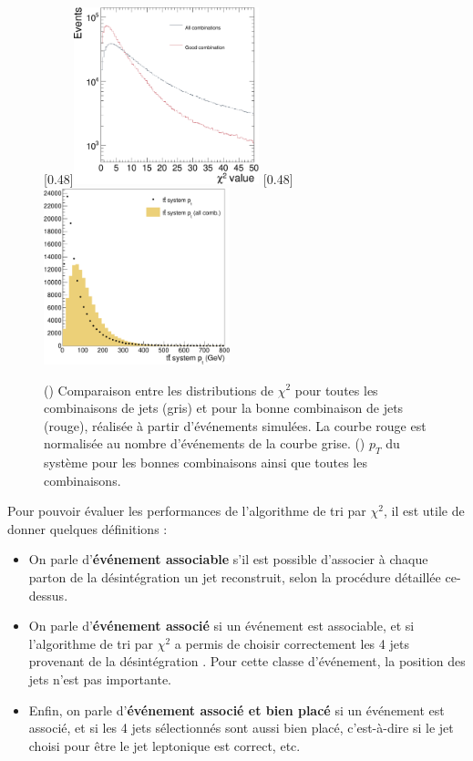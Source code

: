 \begin{figure}[tbp] \centering
    \subcaptionbox{\label{fig:chi2_distribution}}[0.48\textwidth]{\includegraphics[width=0.48\textwidth]{chapitre6/figs/chi2/chi2_distribution.pdf}} \hfill
    \subcaptionbox{\label{fig:chi2_ptsyst}}[0.48\textwidth]{\includegraphics[width=0.48\textwidth]{chapitre6/figs/chi2/chi2_discrimant_combinations_pt_syst.pdf}}
    \caption{() Comparaison entre les distributions de $\chi^2$ pour toutes les combinaisons de jets (\textcolor{bleu_gris}{gris}) et pour la bonne combinaison de jets (\textcolor{rouge_grandmere}{rouge}), réalisée à partir d'événements \ttbar simulées. La courbe \textcolor{rouge_grandmere}{rouge} est normalisée au nombre d'événements de la courbe \textcolor{bleu_gris}{grise}. () $p_T$ du système \ttbar pour les bonnes combinaisons ainsi que toutes les combinaisons.}
\end{figure}

Pour pouvoir évaluer les performances de l'algorithme de tri par $\chi^2$, il est utile de donner quelques définitions :

\begin{itemize} \label{page:chi2_def}
    \item On parle d'\textbf{événement associable} s'il est possible d'associer à chaque parton de la désintégration \ttbar un jet reconstruit, selon la procédure détaillée ce-dessus.
    \item On parle d'\textbf{événement associé} si un événement est associable, et si l'algorithme de tri par $\chi^2$ a permis de choisir correctement les 4 jets provenant de la désintégration \ttbar. Pour cette classe d'événement, la position des jets n'est pas importante.
    \item Enfin, on parle d'\textbf{événement associé et bien placé} si un événement est associé, et si les 4 jets sélectionnés sont aussi bien placé, c'est-à-dire si le jet choisi pour être le jet \Pbottom leptonique est correct, etc.
\end{itemize}

